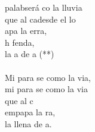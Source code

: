 \begin{cancion}[Mi Palabra][Nico]%
	 palabserá co la lluvia\\
	que al cadesde el lo\\
	apa la erra,\\
	h fenda,\\
	la a de a (**)\\
\jump\\
	Mi para se como la via,\\
	mi para se como la via\\
	que al c  \\
	empapa la ra,\\
	la llena de a.\\
\end{cancion}%
